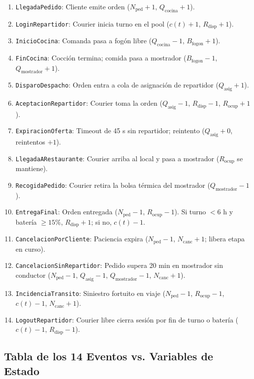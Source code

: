 \documentclass[11pt,letterpaper]{article}
\begin{document}
\begin{enumerate}[leftmargin=1.5em, itemsep=0.15em]
    \item \texttt{LlegadaPedido}: Cliente emite orden ($N_{\text{ped}} + 1$, $Q_{\text{cocina}} + 1$).
    \item \texttt{LoginRepartidor}: Courier inicia turno en el pool ($c(t) + 1$, $R_{\text{disp}} + 1$).
    \item \texttt{InicioCocina}: Comanda pasa a fogón libre ($Q_{\text{cocina}} - 1$, $B_{\text{fogon}} + 1$).
    \item \texttt{FinCocina}: Cocción termina; comida pasa a mostrador ($B_{\text{fogon}} - 1$, $Q_{\text{mostrador}} + 1$).
    \item \texttt{DisparoDespacho}: Orden entra a cola de asignación de repartidor ($Q_{\text{asig}} + 1$).
    \item \texttt{AceptacionRepartidor}: Courier toma la orden ($Q_{\text{asig}} - 1$, $R_{\text{disp}} - 1$, $R_{\text{ocup}} + 1$).
    \item \texttt{ExpiracionOferta}: Timeout de 45 s sin repartidor; reintento ($Q_{\text{asig}} + 0$, reintentos $+1$).
    \item \texttt{LlegadaARestaurante}: Courier arriba al local y pasa a mostrador ($R_{\text{ocup}}$ se mantiene).
    \item \texttt{RecogidaPedido}: Courier retira la bolsa térmica del mostrador ($Q_{\text{mostrador}} - 1$).
    \item \texttt{EntregaFinal}: Orden entregada ($N_{\text{ped}} - 1$, $R_{\text{ocup}} - 1$). Si turno $< 6\text{ h}$ y batería $\ge 15\%$, $R_{\text{disp}} + 1$; si no, $c(t) - 1$.
    \item \texttt{CancelacionPorCliente}: Paciencia expira ($N_{\text{ped}} - 1$, $N_{\text{canc}} + 1$; libera etapa en curso).
    \item \texttt{CancelacionSinRepartidor}: Pedido supera 20 min en mostrador sin conductor ($N_{\text{ped}} - 1$, $Q_{\text{asig}} - 1$, $Q_{\text{mostrador}} - 1$, $N_{\text{canc}} + 1$).
    \item \texttt{IncidenciaTransito}: Siniestro fortuito en viaje ($N_{\text{ped}} - 1$, $R_{\text{ocup}} - 1$, $c(t) - 1$, $N_{\text{canc}} + 1$).
    \item \texttt{LogoutRepartidor}: Courier libre cierra sesión por fin de turno o batería ($c(t) - 1$, $R_{\text{disp}} - 1$).
\end{enumerate}

\subsection{Tabla de los 14 Eventos vs. Variables de Estado}
\end{document}
